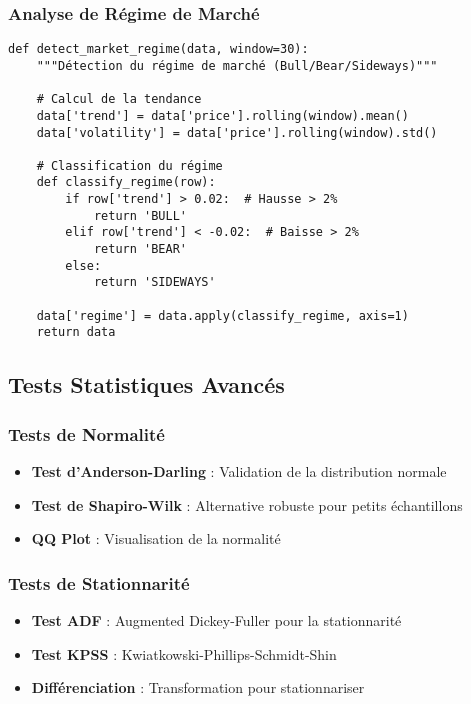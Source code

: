 \subsubsection{Analyse de Régime de Marché}

\begin{verbatim}
def detect_market_regime(data, window=30):
    """Détection du régime de marché (Bull/Bear/Sideways)"""
    
    # Calcul de la tendance
    data['trend'] = data['price'].rolling(window).mean()
    data['volatility'] = data['price'].rolling(window).std()
    
    # Classification du régime
    def classify_regime(row):
        if row['trend'] > 0.02:  # Hausse > 2%
            return 'BULL'
        elif row['trend'] < -0.02:  # Baisse > 2%
            return 'BEAR'
        else:
            return 'SIDEWAYS'
    
    data['regime'] = data.apply(classify_regime, axis=1)
    return data
\end{verbatim}

\subsection{Tests Statistiques Avancés}

\subsubsection{Tests de Normalité}

\begin{itemize}
    \item \textbf{Test d'Anderson-Darling} : Validation de la distribution normale
    \item \textbf{Test de Shapiro-Wilk} : Alternative robuste pour petits échantillons
    \item \textbf{QQ Plot} : Visualisation de la normalité
\end{itemize}

\subsubsection{Tests de Stationnarité}

\begin{itemize}
    \item \textbf{Test ADF} : Augmented Dickey-Fuller pour la stationnarité
    \item \textbf{Test KPSS} : Kwiatkowski-Phillips-Schmidt-Shin
    \item \textbf{Différenciation} : Transformation pour stationnariser
\end{itemize}

